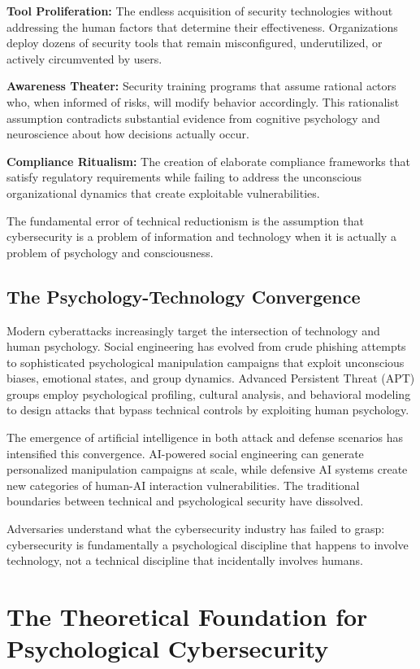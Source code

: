 \documentclass[10pt, twocolumn]{article}
\begin{document}
\textbf{Tool Proliferation:} The endless acquisition of security technologies without addressing the human factors that determine their effectiveness. Organizations deploy dozens of security tools that remain misconfigured, underutilized, or actively circumvented by users.

\textbf{Awareness Theater:} Security training programs that assume rational actors who, when informed of risks, will modify behavior accordingly. This rationalist assumption contradicts substantial evidence from cognitive psychology and neuroscience about how decisions actually occur.

\textbf{Compliance Ritualism:} The creation of elaborate compliance frameworks that satisfy regulatory requirements while failing to address the unconscious organizational dynamics that create exploitable vulnerabilities.

The fundamental error of technical reductionism is the assumption that cybersecurity is a problem of information and technology when it is actually a problem of psychology and consciousness.

\subsection{The Psychology-Technology Convergence}

Modern cyberattacks increasingly target the intersection of technology and human psychology. Social engineering has evolved from crude phishing attempts to sophisticated psychological manipulation campaigns that exploit unconscious biases, emotional states, and group dynamics. Advanced Persistent Threat (APT) groups employ psychological profiling, cultural analysis, and behavioral modeling to design attacks that bypass technical controls by exploiting human psychology.

The emergence of artificial intelligence in both attack and defense scenarios has intensified this convergence. AI-powered social engineering can generate personalized manipulation campaigns at scale, while defensive AI systems create new categories of human-AI interaction vulnerabilities. The traditional boundaries between technical and psychological security have dissolved.

Adversaries understand what the cybersecurity industry has failed to grasp: cybersecurity is fundamentally a psychological discipline that happens to involve technology, not a technical discipline that incidentally involves humans.

\section{The Theoretical Foundation for Psychological Cybersecurity}
\end{document}
